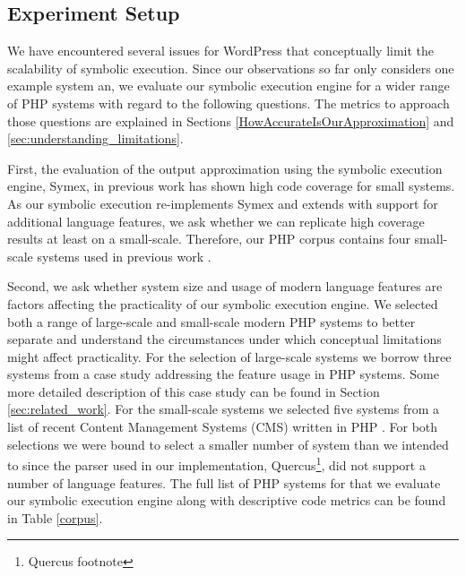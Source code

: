 \documentclass[sigconf]{acmart}
\renewcommand{\sf}[1]{\textsf{#1}}
\begin{document}
\subsection{Experiment Setup} \label{sec:experiment_setup}
We have encountered several issues for \sf{WordPress} that conceptually limit
the scalability of symbolic execution. Since our observations so far only considers
one example system an, we evaluate our symbolic execution engine for a wider
range of PHP systems with regard to the following questions. The metrics to
approach those questions are explained in Sections
\ref{HowAccurateIsOurApproximation} and \ref{sec:understanding_limitations}.

First, the evaluation of the output approximation using the symbolic execution
engine, \sf{Symex}, in previous work \cite{Nguyen:2014:BCG:2635868.2635928} has
shown high code coverage for small systems. As our symbolic execution
re-implements \sf{Symex} and extends with support for additional language
features, we ask whether we can replicate high coverage results at least on a small-scale. Therefore, our PHP
corpus contains four small-scale systems used in previous work \cite{Nguyen:2014:BCG:2635868.2635928}.

Second, we ask whether system size and usage of modern language features are
factors affecting the practicality of our symbolic execution engine. We
selected both a range of large-scale and small-scale modern PHP systems to
better separate and understand the circumstances under which conceptual
limitations might affect practicality. For the selection of large-scale systems
we borrow three systems from a case study addressing the feature usage in PHP
systems. Some more detailed description of this case study can be found in
Section \ref{sec:related_work}. For the small-scale systems we selected five systems from
a list of recent Content Management Systems (CMS) written in PHP \cite{codegeekz}. For both
selections we were bound to select a smaller number of system than we intended
to since the parser used in our implementation, \sf{Quercus}\footnote{Quercus
footnote}, did not support a number of language features. The full list of PHP
systems for that we evaluate our symbolic execution engine along with
descriptive code metrics can be found in Table \ref{corpus}.
\end{document}
